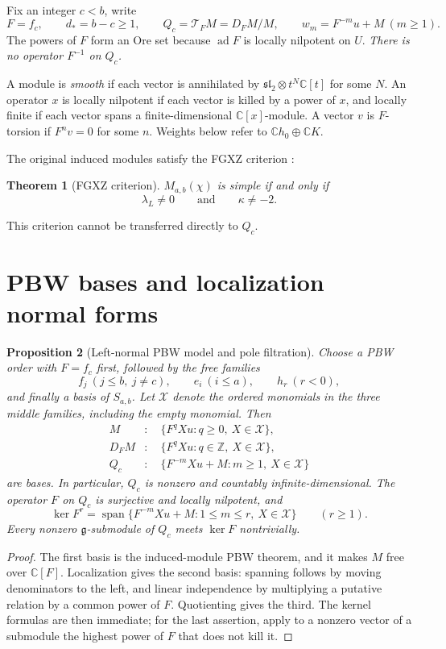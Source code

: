 \documentclass[11pt,a4paper]{article}
\newcommand{\C}{\mathbb C}
\newcommand{\Z}{\mathbb Z}
\newcommand{\g}{\mathfrak g}
\newcommand{\slc}{\mathfrak{sl}_2}
\newcommand{\ad}{\operatorname{ad}}
\newcommand{\Span}{\operatorname{span}}
\newcommand{\X}{\mathcal X}
\newcommand{\T}{\mathcal T}
\theoremstyle{plainupright}
\newtheorem{proposition}{Proposition}[section]
\newtheorem{theorem}[proposition]{Theorem}
\begin{document}
Fix an integer \(c<b\), write
\[
F=f_c,\qquad d_*=b-c\ge1,\qquad
Q_c=\T_FM=D_FM/M,\qquad w_m=F^{-m}u+M\ (m\ge1).
\]
The powers of \(F\) form an Ore set because \(\ad F\) is locally nilpotent on
\(U\). \emph{There is no operator \(F^{-1}\) on \(Q_c\).}

A module is \emph{smooth} if each vector is annihilated by
\(\slc\otimes t^N\C[t]\) for some \(N\). An operator \(x\) is locally
nilpotent if each vector is killed by a power of \(x\), and locally finite if
each vector spans a finite-dimensional \(\C[x]\)-module. A vector \(v\) is
\(F\)-torsion if \(F^nv=0\) for some \(n\). Weights below refer to
\(\C h_0\oplus\C K\).

The original induced modules satisfy the FGXZ criterion \cite{FGXZ}:

\begin{theorem}[FGXZ criterion]\label{thm:fgxz}
\(M_{a,b}(\chi)\) is simple if and only if
\[
\lambda_L\ne0\qquad\text{and}\qquad \kappa\ne-2.
\]
\end{theorem}

This criterion cannot be transferred directly to \(Q_c\).

\section{PBW bases and localization normal forms}\label{sec:pbw}

\begin{proposition}[Left-normal PBW model and pole filtration]\label{prop:pbw}
Choose a PBW order with \(F=f_c\) first, followed by the free families
\[
f_j\ (j\le b,\ j\ne c),\qquad e_i\ (i\le a),\qquad h_r\ (r<0),
\]
and finally a basis of \(S_{a,b}\). Let \(\X\) denote the ordered monomials in
the three middle families, including the empty monomial. Then
\begin{align*}
M &: \quad \{F^qXu:q\ge0,\ X\in\X\},\\
D_FM &: \quad \{F^qXu:q\in\Z,\ X\in\X\},\\
Q_c &: \quad \{F^{-m}Xu+M:m\ge1,\ X\in\X\}
\end{align*}
are bases. In particular, \(Q_c\) is nonzero and countably
infinite-dimensional. The operator \(F\) on \(Q_c\) is surjective and locally
nilpotent, and
\[
\ker F^r=\Span\{F^{-m}Xu+M:1\le m\le r,\ X\in\X\}\qquad(r\ge1).
\]
Every nonzero \(\g\)-submodule of \(Q_c\) meets \(\ker F\) nontrivially.
\end{proposition}

\begin{proof}
The first basis is the induced-module PBW theorem, and it makes \(M\) free
over \(\C[F]\). Localization gives the second basis: spanning follows by
moving denominators to the left, and linear independence by multiplying a
putative relation by a common power of \(F\). Quotienting gives the third.
The kernel formulas are then immediate; for the last assertion, apply to a
nonzero vector of a submodule the highest power of \(F\) that does not kill
it.
\end{proof}
\end{document}
